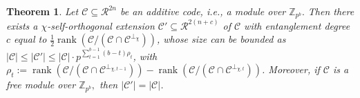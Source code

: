 \documentclass{article}
\DeclareMathOperator{\rank}{rank}
\newtheorem{thm}{Theorem}[section]
\theoremstyle{remark}
\theoremstyle{definition}
\numberwithin{equation}{section}
\begin{document}
  \begin{thm}\label{tEAC}  Let $\mathcal{C} \subseteq \mathcal{R}^{2n}$ be an additive code,  i.e.,  a module over $\mathbb{Z}_{p^b}.$ Then there exists a $\chi$-self-orthogonal extension $\mathcal{C}{'} \subseteq \mathcal{R}^{2(n+c)}$ of $\mathcal{C}$  with entanglement degree $c$ equal to $\frac12 \rank(\mathcal{C}/(\mathcal{C} \cap \mathcal{C}^{\perp_\chi}))$, whose size can be bounded as  $|\mathcal{C}|  \leq |\mathcal{C}{'}| \leq |\mathcal{C}| \cdot p^{\sum_{t=1}^{b-1} (b-t)  \rho_t}$, with $\rho_t:=\rank(\mathcal{C}/(\mathcal{C} \cap \mathcal{C}^{\perp_{\chi,t-1}}))-\rank(\mathcal{C}/(\mathcal{C} \cap \mathcal{C}^{\perp_{\chi,t}}))$. Moreover, if $\mathcal{C}$ is a free module over $\mathbb{Z}_{p^b},$ then $|\mathcal{C}'| =|\mathcal{C}|$.
  \end{thm}
\end{document}
